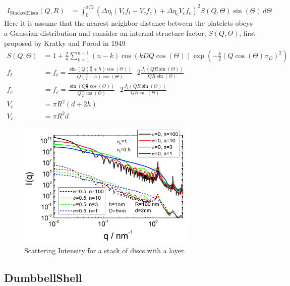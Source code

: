 \begin{align}
I_\text{StackedDiscs}(Q,R)&= \int_0^{\pi/2}\left( \Delta\eta_l
\left(V_t f_t - V_c f_c\right) + \Delta\eta_c  V_c f_c \right)^2
S(Q,\Theta) \sin(\Theta)\, d\Theta
\end{align}
Here \cite{Kratky1949,Frielinghaus2017,Vaia2002,Hanley2003} it is assume that the nearest neighbor distance between the
platelets obeys a Gaussian distribution and consider an internal
structure factor, $S(Q,\Theta)$, first proposed by Kratky and Porod
in 1949 \cite{Kratky1949}
\begin{align}
S(Q,\Theta) &=  1+\frac{2}{n} \sum_{k=1}^{n-1} (n-k)
\cos(kDQ\cos(\Theta))
     \exp\left(-\frac{k}{2}\left(Q\cos(\Theta) \sigma_D\right)^2\right) \\
f_t &= f_t = \frac{\sin\left(Q(\frac{d}{2}+h)\cos(\Theta)\right)}{Q(\frac{d}{2}+h)\cos(\Theta)} \,\,\,\,2\frac{J_1(QR\sin(\Theta))}{QR\sin(\Theta)} \\
f_c &= f_c = \frac{\sin\left(Q\frac{d}{2}\cos(\Theta)\right)}{Q\frac{d}{2}\cos(\Theta)} \,\,\,\,2\frac{J_1(QR\sin(\Theta))}{QR\sin(\Theta)}\\
V_t &= \pi R^2 (d+2h)\\
V_c &= \pi R^2 d
\end{align}


\begin{figure}[htb]
\begin{center}
\includegraphics[width=0.768\textwidth]{../images/form_factor/cluster/StackedDiscsIQ.png}
\end{center}
\caption{Scattering Intensity for a stack of discs with a layer.}
\label{fig:StackedDiscs}
\end{figure}


\clearpage
\subsection{DumbbellShell}
\label{sect:DumbbellShell}
~\\

